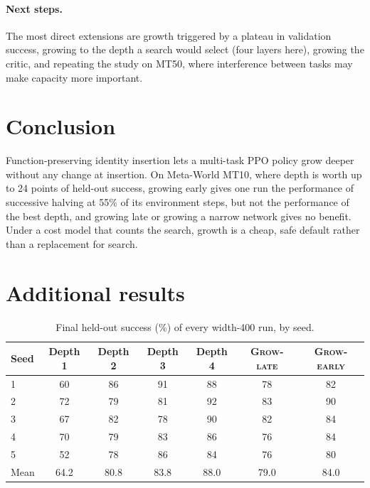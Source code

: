 \documentclass{article}
\newcommand{\growE}{\textsc{Grow-early}}
\newcommand{\growL}{\textsc{Grow-late}}
\begin{document}
\paragraph{Next steps.}
The most direct extensions are growth triggered by a plateau in validation success, growing to the depth a search would select (four layers here), growing the critic, and repeating the study on MT50, where interference between tasks may make capacity more important.

\section{Conclusion}

Function-preserving identity insertion lets a multi-task PPO policy grow deeper without any change at insertion.
On Meta-World MT10, where depth is worth up to 24 points of held-out success, growing early gives one run the performance of successive halving at 55\% of its environment steps, but not the performance of the best depth, and growing late or growing a narrow network gives no benefit.
Under a cost model that counts the search, growth is a cheap, safe default rather than a replacement for search.




\appendix

\section{Additional results}

\begin{table}[h]
    \caption{Final held-out success (\%) of every width-400 run, by seed.}
    \label{tab:seeds}
    \centering
    \begin{tabular}{lcccccc}
        \toprule
        Seed & Depth 1 & Depth 2 & Depth 3 & Depth 4 & \growL{} & \growE{} \\
        \midrule
        1 & 60 & 86 & 91 & 88 & 78 & 82 \\
        2 & 72 & 79 & 81 & 92 & 83 & 90 \\
        3 & 67 & 82 & 78 & 90 & 82 & 84 \\
        4 & 70 & 79 & 83 & 86 & 76 & 84 \\
        5 & 52 & 78 & 86 & 84 & 76 & 80 \\
        \midrule
        Mean & 64.2 & 80.8 & 83.8 & 88.0 & 79.0 & 84.0 \\
        \bottomrule
    \end{tabular}
\end{table}
\end{document}
